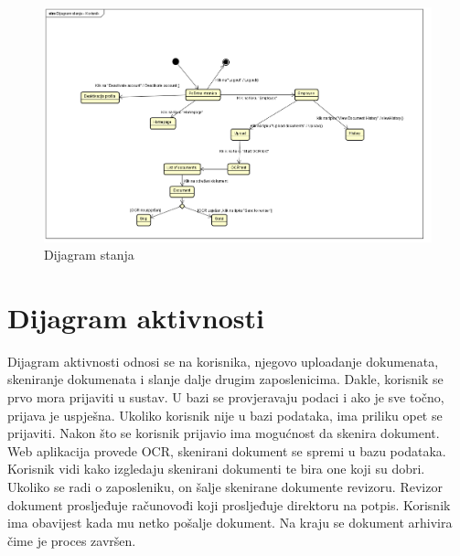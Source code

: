 			\begin{figure}[H]
				\includegraphics[scale=0.5]{slike/Dijagram stanja.png} %
				\centering
				\caption{Dijagram stanja}
				\label{DS}
			\end{figure}
			
			\eject 
		
		\section{Dijagram aktivnosti}
			
			 Dijagram aktivnosti odnosi se na korisnika, njegovo uploadanje dokumenata, skeniranje dokumenata i slanje dalje drugim zaposlenicima. Dakle, korisnik se prvo mora prijaviti u sustav. U bazi se provjeravaju podaci i ako je sve točno, prijava je uspješna. Ukoliko korisnik nije u bazi podataka, ima priliku opet se prijaviti. Nakon što se korisnik prijavio ima mogućnost da skenira dokument. Web aplikacija provede OCR, skenirani dokument se spremi u bazu podataka. Korisnik vidi kako izgledaju skenirani dokumenti te bira one koji su dobri. Ukoliko se radi o zaposleniku, on šalje skenirane dokumente revizoru. Revizor dokument prosljeđuje računovođi koji prosljeđuje direktoru na potpis. Korisnik ima obavijest kada mu netko pošalje dokument. Na kraju se dokument arhivira čime je proces završen.
			 
